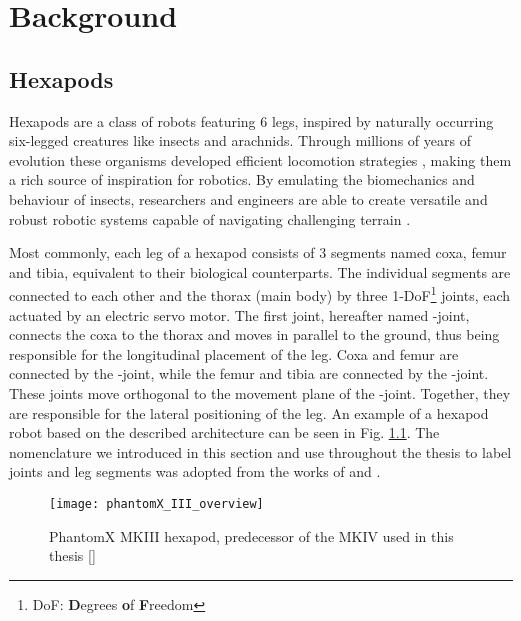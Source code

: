 \chapter{Background}
\label{ch:background}


\section{Hexapods} \label{sec: Hexapods}
Hexapods are a class of robots featuring 6 legs, inspired by naturally occurring six-legged creatures like insects and arachnids.
Through millions of years of evolution these organisms developed efficient locomotion strategies \parencite{neville2006bipedal}, making them a rich source of inspiration for robotics.
By emulating the biomechanics and behaviour of insects, researchers and engineers are able to create versatile and robust robotic systems capable of navigating challenging terrain \parencite{irawan2011optimal, ouyang2021adaptive, schilling2013walknet}.

Most commonly, each leg of a hexapod consists of 3 segments named coxa, femur and tibia, equivalent to their biological counterparts.
The individual segments are connected to each other and the thorax (main body) by three 1-DoF\footnote{DoF: \textbf{D}egrees \textbf{o}f \textbf{F}reedom} joints, each actuated by an electric servo motor.
The first joint, hereafter named \textalpha-joint, connects the coxa to the thorax and moves in parallel to the ground, thus being responsible for the longitudinal placement of the leg.
Coxa and femur are connected by the \textbeta-joint, while the femur and tibia are connected by the \textgamma-joint. 
These joints move orthogonal to the movement plane of the \textalpha-joint. Together, they are responsible for the lateral positioning of the leg.
An example of a hexapod robot based on the described architecture can be seen in Fig. \ref{figure: PhantomX MKIII}.
The nomenclature we introduced in this section and use throughout the thesis to label joints and leg segments was adopted from the works of 
\cite{schilling2013walknet} and \cite{HeterarchicalArchitectureSchilling}.

\begin{figure}[h]
	\centerline{\texttt{[image: phantomX\_III\_overview]}}
	\caption{PhantomX MKIII hexapod, predecessor of the MKIV used in this thesis [\cite{PhantomX_MKIII}]}
	\label{figure: PhantomX MKIII}
\end{figure}


